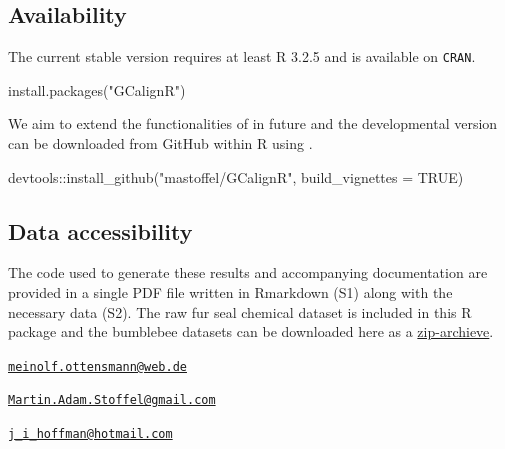 \subsection{Availability}\label{availability}

The current stable version requires at least R 3.2.5 and is available on
\texttt{CRAN}.

\begin{Schunk}
\begin{Sinput}
install.packages("GCalignR")
\end{Sinput}
\end{Schunk}

We aim to extend the functionalities of  in future and the
developmental version can be downloaded from GitHub within R using
\href{https://cran.r-project.org/web/packages/devtools/index.html}{}
\citep{Wickham.2016}.

\begin{Schunk}
\begin{Sinput}
devtools::install_github("mastoffel/GCalignR", build_vignettes = TRUE)
\end{Sinput}
\end{Schunk}

\subsection{Data accessibility}\label{data-accessibility}

The code used to generate these results and accompanying documentation
are provided in a single PDF file written in Rmarkdown (S1) along with
the necessary data (S2). The raw fur seal chemical dataset is included
in this R package and the bumblebee datasets \citep{Dellicour.2013} can
be downloaded here as a
\href{http://onlinelibrary.wiley.com/store/10.1002/jssc.201300388/asset/supinfo/jssc3437-sup-0001-TableS1.zip?v=1&s=57d5d58273d1d4207e70c72cecd5bba4b1fe95a1}{zip-archieve}.



\address{%
Meinolf Ottensmann\\
Department of Animal Behaviour\\
Bielefeld University\\ Morgenbreede 45\\ 33615 Bielefeld\\
}
\href{mailto:meinolf.ottensmann@web.de}{\nolinkurl{meinolf.ottensmann@web.de}}

\address{%
Martin A. Stoffel\\
Department of Animal Behaviour\\
Bielefeld University\\ Morgenbreede 45\\ 33615 Bielefeld\\
}
\href{mailto:Martin.Adam.Stoffel@gmail.com}{\nolinkurl{Martin.Adam.Stoffel@gmail.com}}

\address{%
Joseph I. Hoffman\\
Department of Animal Behaviour\\
Bielefeld University\\ Morgenbreede 45\\ 33615 Bielefeld\\
}
\href{mailto:j_i_hoffman@hotmail.com}{\nolinkurl{j\_i\_hoffman@hotmail.com}}

